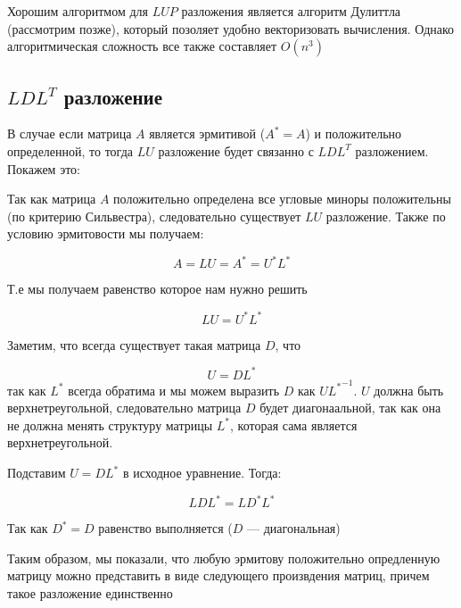 \documentclass{article}
\begin{document}
    Хорошим алгоритмом для $LUP$ разложения является алгоритм Дулиттла (рассмотрим позже), который позоляет удобно векторизовать вычисления. 
    Однако алгоритмическая сложность все также составляет $O(n^{3})$


    \subsection{$LDL^{T}$ разложение}

    В случае если матрица $A$ является эрмитивой ($A^{*} = A$) и положительно определенной, то тогда $LU$ разложение будет связанно с
    $LDL^{T}$ разложением. Покажем это: 

    \quad 

    Так как матрица $A$ положительно определена все угловые миноры положительны (по критерию Сильвестра), 
    следовательно существует $LU$ разложение. Также по условию эрмитовости мы получаем: 

    \begin{equation}
        A = LU = A^{*} = U^{*} L^{*}
    \end{equation}
    
    Т.е мы получаем равенство которое нам нужно решить 

    \begin{equation}
        LU = U^{*} L^{*}
    \end{equation}

    Заметим, что всегда существует такая матрица $D$, что 

    \begin{equation}
        U = D L^{*}
    \end{equation}
    так как $L^{*}$ всегда обратима и мы можем выразить $D$ как $U {L^{*}}^{-1}$. $U$ должна быть верхнетреугольной, следовательно
    матрица $D$ будет диагонаальной, так как она не должна менять структуру матрицы $L^{*}$, которая сама является верхнетреугольной.

    \quad 

    Подставим $U = D L^{*}$ в исходное уравнение. Тогда: 

    \begin{equation}
        L D L^{*} =  L D^{*} L^{*}
    \end{equation}

    Так как $D^{*} = D$ равенство выполняется ($D$  --- диагональная)

    \quad 

    Таким образом, мы показали, что любую эрмитову положительно опредленную матрицу можно представить в виде следующего произвдения матриц, причем такое 
    разложение единственно
\end{document}
